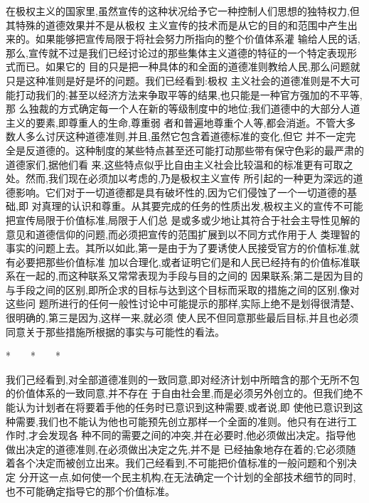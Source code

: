 ﻿\documentclass[12pt]{article}
\begin{document}
在极权主义的国家里,虽然宣传的这种状况给予它一种控制人们思想的独特权力,但其特殊的道德效果并不是从极权
主义宣传的技术而是从它的目的和范围中产生出来的。如果能够把宣传局限于将社会努力所指向的整个价值体系灌
输给人民的话,那么,宣传就不过是我们已经讨论过的那些集体主义道德的特征的一个特定表现形式而已。如果它的
目的只是把一种具体的和全面的道德准则教给人民,那么问题就只是这种准则是好是坏的问题。我们已经看到:极权
主义社会的道德准则是不大可能打动我们的;甚至以经济方法来争取平等的结果,也只能是一种官方强加的不平等,那
么独裁的方式确定每一个人在新的等级制度中的地位;我们道德中的大部分人道主义的要素,即尊重人的生命,尊重弱
者和普遍地尊重个人等,都会消逝。不管大多数人多么讨厌这种道德准则,并且,虽然它包含着道德标准的变化,但它
并不一定完全是反道德的。这种制度的某些特点甚至还可能打动那些带有保守色彩的最严肃的道德家们,据他们看
来,这些特点似乎比自由主义社会比较温和的标准更有可取之处。然而,我们现在必须加以考虑的,乃是极权主义宣传
所引起的一种更为深远的道德影响。它们对于一切道德都是具有破坏性的,因为它们侵蚀了一个一切道德的基础,即
对真理的认识和尊重。从其要完成的任务的性质出发,极权主义的宣传不可能把宣传局限于价值标准,局限于人们总
是或多或少地让其符合于社会主导性见解的意见和道德信仰的问题,而必须把宣传的范围扩展到以不同方式作用于人
类理智的事实的问题上去。其所以如此,第一是由于为了要诱使人民接受官方的价值标准,就有必要把那些价值标准
加以合理化,或者证明它们是和人民已经持有的价值标准联系在一起的,而这种联系又常常表现为手段与目的之间的
因果联系;第二是因为目的与手段之间的区别,即所企求的目标与达到这个目标而采取的措施之间的区别,像对这些问
题所进行的任何一般性讨论中可能提示的那样,实际上绝不是划得很清楚、很明确的,第三是因为,这样一来,就必须
使人民不但同意那些最后目标,并且也必须同意关于那些措施所根据的事实与可能性的看法。

*　　*　　*

我们己经看到,对全部道德准则的一致同意,即对经济计划中所暗含的那个无所不包的价值体系的一致同意,并不存在
于自由社会里,而是必须另外创立的。但我们绝不能认为计划者在将要着手他的任务时已意识到这种需要,或者说,即
使他已意识到这种需要,我们也不能认为他也可能预先创立那样一个全面的准则。他只有在进行工作时,才会发现各
种不同的需要之间的冲突,并在必要时,他必须做出决定。指导他做出决定的道德准则,在必须做出决定之先,并不是
已经抽象地存在着的;它必须随着各个决定而被创立出来。我们己经看到,不可能把价值标准的一般问题和个别决定
分开这一点,如何使一个民主机构,在无法确定一个计划的全部技术细节的同时,也不可能确定指导它的那个价值标准。
\end{document}
